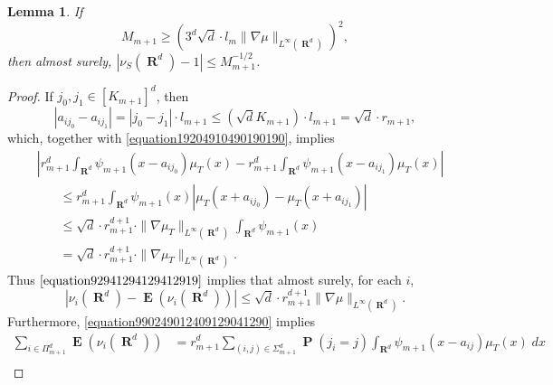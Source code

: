 \documentclass[12pt,reqno]{article}
\numberwithin{equation}{section}
\DeclareMathOperator{\RR}{\mathbf{R}}
\newtheorem{lemma}[theorem]{Lemma}
\DeclareMathOperator{\EE}{\mathbf{E}}
\DeclareMathOperator{\PP}{\mathbf{P}}
\begin{document}
\begin{lemma} \label{nuNormalizationLemma}
    If
    \begin{equation} \label{equation10491249012}
        M_{m+1} \geq \left( 3^d \sqrt{d} \cdot l_m \| \nabla \mu \|_{L^\infty(\RR^d)} \right)^2,
    \end{equation}
    then almost surely, $|\nu_S(\RR^d) - 1| \leq M_{m+1}^{-1/2}$.
\end{lemma}
\begin{proof}
    If $j_0, j_1 \in [K_{m+1}]^d$, then
    \[ |a_{ij_0} - a_{ij_1}| = |j_0 - j_1| \cdot l_{m+1} \leq (\sqrt{d} K_{m+1}) \cdot l_{m+1} = \sqrt{d} \cdot r_{m+1}, \]
    which, together with \eqref{equation19204910490190190}, implies
    \begin{equation} \label{equation92941294129412919}
    \begin{split}
        &\left| r_{m+1}^d \int_{\RR^d} \psi_{m+1}(x - a_{ij_0}) \mu_T(x) - r_{m+1}^d \int_{\RR^d} \psi_{m+1}(x - a_{ij_1}) \mu_T(x) \right|\\
        &\ \ \ \ \ \ \ \ \leq r_{m+1}^d \int_{\RR^d} \psi_{m+1}(x) \left| \mu_T(x + a_{ij_0}) - \mu_T(x + a_{ij_1}) \right|\\
        &\ \ \ \ \ \ \ \ \leq \sqrt{d} \cdot r_{m+1}^{d+1} \cdot \| \nabla \mu_T \|_{L^\infty(\RR^d)} \int_{\RR^d} \psi_{m+1}(x)\\
        &\ \ \ \ \ \ \ \ = \sqrt{d} \cdot r_{m+1}^{d+1} \cdot \| \nabla \mu_T \|_{L^\infty(\RR^d)}.
    \end{split}
    \end{equation}
    Thus $\eqref{equation92941294129412919}$ implies that almost surely, for each $i$,
    \begin{equation} \label{equation491040912491}
        |\nu_i(\RR^d) - \EE(\nu_i(\RR^d))| \leq \sqrt{d} \cdot r_{m+1}^{d+1} \| \nabla \mu \|_{L^\infty(\RR^d)}.
    \end{equation}
    Furthermore, \eqref{equation990249012409129041290} implies
    \begin{equation} \label{9921490124912}
    \begin{split}
        \sum_{i \in \Pi_{m+1}^d} \EE(\nu_i(\RR^d)) &= r_{m+1}^d \sum\nolimits_{(i,j) \in \Sigma_{m+1}^d} \PP(j_i = j) \int_{\RR^d} \psi_{m+1}(x - a_{ij}) \mu_T(x)\; dx\\

\end{split}
\end{equation}
\end{proof}
\end{document}
